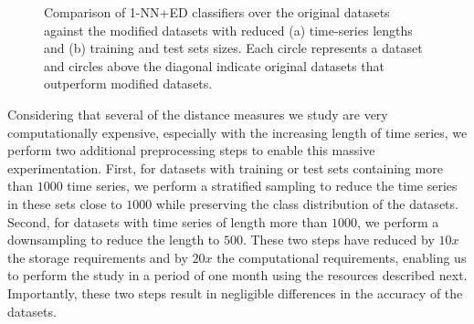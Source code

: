 \begin{figure}
	\vspace*{-0.3cm}
	\centering
	 \vspace*{-0.2cm}
	\caption{Comparison of 1-NN+ED classifiers over the original datasets against the modified datasets with reduced (a) time-series lengths and (b) training and test sets sizes. Each circle represents a dataset and circles above the diagonal  indicate original datasets that outperform modified datasets.}%
	\label{fig:modifieddatasets}%
\end{figure}

Considering that several of the distance measures we study are very computationally expensive, especially with the increasing length of time series, we perform two additional preprocessing steps to enable this massive experimentation. First, for datasets with training or test sets containing more than $1000$ time series, we perform a stratified sampling to reduce the time series in these sets close to $1000$ while preserving the class distribution of the datasets. Second, for datasets with time series of length more than $1000$, we perform a downsampling to reduce the length to $500$. These two steps have reduced by $10x$ the storage requirements and by $20x$ the computational requirements, enabling us to perform the study in a period of one month using the resources described next. Importantly, these two steps result in negligible differences in the accuracy of the datasets. 

